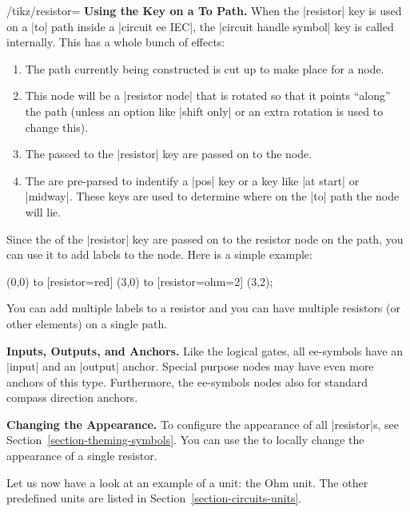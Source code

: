 \begin{key}{/tikz/resistor=}
  \medskip\textbf{Using the Key on a To Path.}
  When the |resistor| key is used on a |to| path inside a
  |circuit ee IEC|, the |circuit handle symbol| key is called
  internally. This has a whole bunch of effects:
  \begin{enumerate}
  \item The path currently being constructed is cut up to make place
    for a node.
  \item This node will be a |resistor node| that is rotated so that it
    points ``along'' the path (unless an option like |shift only| or
    an extra rotation is used to change this).
  \item The  passed to the |resistor| key are passed on
    to the node.
  \item The  are pre-parsed to indentify a |pos| key or
    a key like |at start| or |midway|. These keys are used to
    determine where on the |to| path the node will lie.
  \end{enumerate}

  Since the  of the |resistor| key are passed on to the
  resistor node on the path, you can use it to add labels to the
  node. Here is a simple example:
  
\begin{codeexample}[]
  \draw (0,0) to [resistor=red]        (3,0)
              to [resistor={ohm=2\mu}] (3,2);
\end{codeexample}

  You can add multiple labels to a resistor and you can have multiple
  resistors (or other elements) on a single path.
  
  \medskip\textbf{Inputs, Outputs, and Anchors.}
  Like the logical gates, all ee-symbols have an |input|
  and an |output| anchor. Special purpose nodes may have even more
  anchors of this type. Furthermore, the ee-symbols nodes also for
  standard compass direction anchors.

  \medskip\textbf{Changing the Appearance.}
  To configure the appearance of all |resistor|s, see 
  Section~\ref{section-theming-symbols}. You can use the
   to locally change the appearance of a single
  resistor. 
\end{key}

Let us now have a look at an example of a unit: the Ohm unit. The
other predefined units are listed in Section~\ref{section-circuits-units}.

